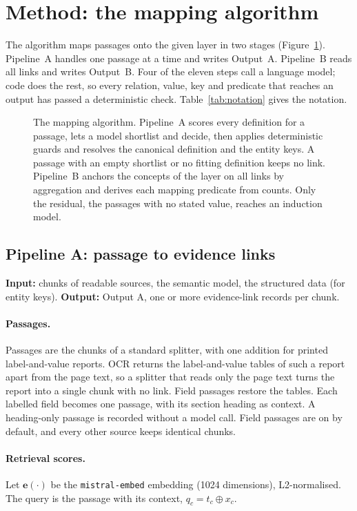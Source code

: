 \documentclass[11pt,a4paper]{article}
\begin{document}
\section{Method: the mapping algorithm}\label{sec:method}
The algorithm maps passages onto the given layer in two stages (Figure~\ref{fig:algorithm}). Pipeline~A handles one passage at a time and writes Output~A. Pipeline~B reads all links and writes Output~B. Four of the eleven steps call a language model; code does the rest, so every relation, value, key and predicate that reaches an output has passed a deterministic check. Table~\ref{tab:notation} gives the notation.

\begin{figure}[H]
\centering
\resizebox{\textwidth}{!}{}
\caption{The mapping algorithm. Pipeline~A scores every definition for a passage, lets a model shortlist and decide, then applies deterministic guards and resolves the canonical definition and the entity keys. A passage with an empty shortlist or no fitting definition keeps no link. Pipeline~B anchors the concepts of the layer on all links by aggregation and derives each mapping predicate from counts. Only the residual, the passages with no stated value, reaches an induction model.}
\label{fig:algorithm}
\end{figure}

\subsection{Pipeline A: passage to evidence links}\label{sec:pipeA}
\noindent\textbf{Input:} chunks of readable sources, the semantic model, the structured data (for entity keys). \textbf{Output:} Output A, one or more evidence-link records per chunk.
\paragraph{Passages.}
Passages are the chunks of a standard splitter, with one addition for printed label-and-value reports. OCR returns the label-and-value tables of such a report apart from the page text, so a splitter that reads only the page text turns the report into a single chunk with no link. Field passages restore the tables. Each labelled field becomes one passage, with its section heading as context. A heading-only passage is recorded without a model call. Field passages are on by default, and every other source keeps identical chunks. %

\paragraph{Retrieval scores.}
Let $\mathbf{e}(\cdot)$ be the \texttt{mistral-embed} embedding (1024 dimensions), L2-normalised. The query is the passage with its context, $q_c = t_c \oplus x_c$.
\end{document}
